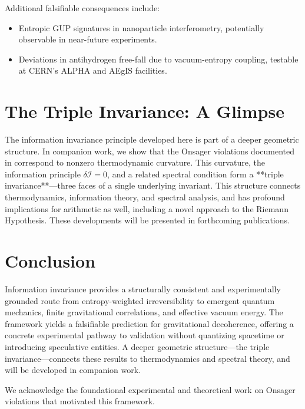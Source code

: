 \documentclass[prd,10pt,twocolumn]{revtex4-2}
\newcommand{\cI}{\mathcal{I}}
\begin{document}
Additional falsifiable consequences include:
\begin{itemize}
    \item Entropic GUP signatures in nanoparticle interferometry, potentially observable in near-future experiments.
    \item Deviations in antihydrogen free-fall due to vacuum-entropy coupling, testable at CERN's ALPHA and AEgIS facilities.
\end{itemize}

\section{The Triple Invariance: A Glimpse}
\label{sec:triple}

The information invariance principle developed here is part of a deeper geometric structure. In companion work, we show that the Onsager violations documented in \cite{Dabas2024preprint} correspond to nonzero thermodynamic curvature. This curvature, the information principle $\delta\cI = 0$, and a related spectral condition form a **triple invariance**—three faces of a single underlying invariant. This structure connects thermodynamics, information theory, and spectral analysis, and has profound implications for arithmetic as well, including a novel approach to the Riemann Hypothesis. These developments will be presented in forthcoming publications.

\section{Conclusion}
\label{sec:conclusion}

Information invariance provides a structurally consistent and experimentally grounded route from entropy-weighted irreversibility to emergent quantum mechanics, finite gravitational correlations, and effective vacuum energy. The framework yields a falsifiable prediction for gravitational decoherence, offering a concrete experimental pathway to validation without quantizing spacetime or introducing speculative entities. A deeper geometric structure—the triple invariance—connects these results to thermodynamics and spectral theory, and will be developed in companion work.

\begin{acknowledgments}
We acknowledge the foundational experimental and theoretical work on Onsager violations \cite{Dabas2024preprint} that motivated this framework.
\end{acknowledgments}
\end{document}
